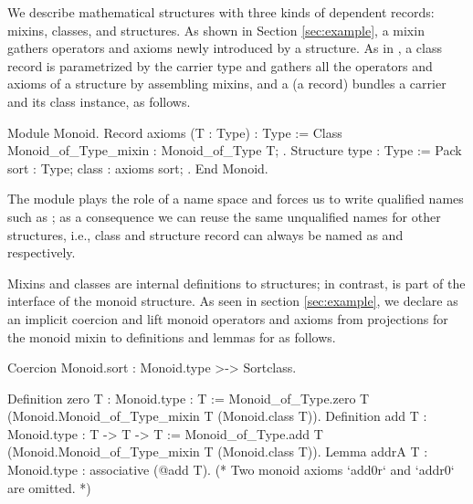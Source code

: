 \documentclass[a4paper,UKenglish,cleveref, autoref]{lipics-v2019}
\newcommand{\mixin}{mixin}
\theoremstyle{implem}
\theoremstyle{implem}
\theoremstyle{command}
\theoremstyle{commands}
\begin{document}
We describe mathematical structures with three kinds of dependent records: mixins, classes, and structures.
As shown in Section \ref{sec:example}, a \mixin{} gathers operators and axioms newly introduced by a structure.
As in \cite[Section 2.4]{DBLP:conf/tphol/GarillotGMR09}\cite[Section 2]{KSdraft}, a class record is parametrized by the carrier type  and gathers all the operators and axioms of a structure by assembling mixins, and a  (a record) bundles a carrier and its class instance, as follows.
\begin{coqcode}
Module Monoid.
Record axioms (T : Type) : Type :=
  Class { Monoid_of_Type_mixin : Monoid_of_Type T; }.
Structure type : Type := Pack { sort : Type; class : axioms sort; }.
End Monoid.
\end{coqcode}
The  module plays the role of a name space and forces us to write
qualified names such as ; as a consequence we can reuse the
same unqualified names for other structures, i.e., class and structure record
can always be named as  and  respectively.

Mixins and classes are internal definitions to structures; in contrast,
 is part of the interface of the monoid structure.
As seen in section \ref{sec:example}, we declare  as an
implicit coercion and lift monoid operators and axioms from projections for
the monoid \mixin{} to definitions and lemmas for  as follows.
\begin{coqcode}
Coercion Monoid.sort : Monoid.type >-> Sortclass.

Definition zero {T : Monoid.type} : T :=
  Monoid_of_Type.zero T (Monoid.Monoid_of_Type_mixin T (Monoid.class T)).
Definition add {T : Monoid.type} : T -> T -> T :=
  Monoid_of_Type.add T (Monoid.Monoid_of_Type_mixin T (Monoid.class T)).
Lemma addrA {T : Monoid.type} : associative (@add T).
(* Two monoid axioms `add0r` and `addr0` are omitted. *)
\end{coqcode}
\end{document}
